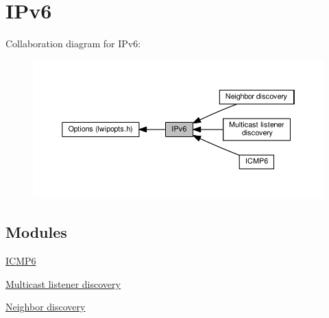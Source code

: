 \hypertarget{group__lwip__opts__ipv6}{}\section{I\+Pv6}
\label{group__lwip__opts__ipv6}
Collaboration diagram for I\+Pv6\+:
\nopagebreak
\begin{figure}[H]
\begin{center}
\leavevmode
\includegraphics[width=350pt]{group__lwip__opts__ipv6}
\end{center}
\end{figure}
\subsection*{Modules}
\begin{DoxyCompactItemize}
\item 
\hyperlink{group__lwip__opts__icmp6}{I\+C\+M\+P6}
\item 
\hyperlink{group__lwip__opts__mld6}{Multicast listener discovery}
\item 
\hyperlink{group__lwip__opts__nd6}{Neighbor discovery}
\end{DoxyCompactItemize}
